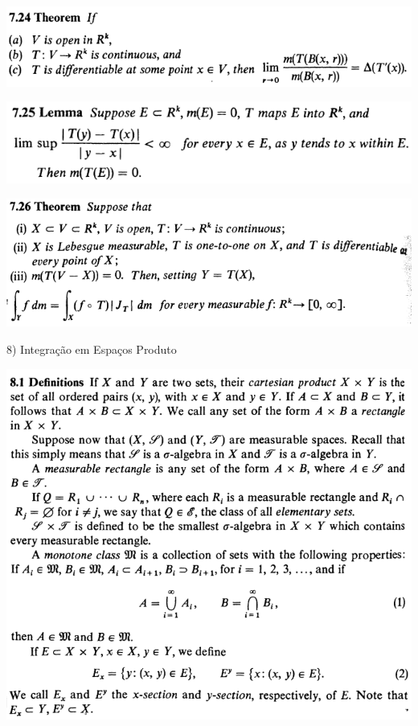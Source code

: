 \documentclass[12pt]{article}
\begin{document}
		\begin{center}
		\includegraphics{7ponto24}
		\end{center}

		\begin{center}
		\includegraphics{7ponto25}
		\end{center}

		\begin{center}
		\includegraphics{7ponto26}
		\end{center}

\vspace{3mm}

8) Integra\c{c}\~ao em Espa\c{c}os Produto

\vspace{3mm}

		\begin{center}
		\includegraphics{d8ponto1}
		\end{center}
\end{document}
